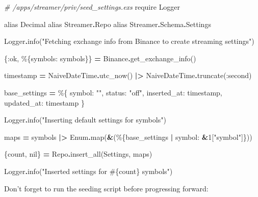 \documentclass[
]{book}
\newenvironment{Shaded}{\begin{snugshade}}{\end{snugshade}}
\newcommand{\CommentTok}[1]{\textcolor[rgb]{0.56,0.35,0.01}{\textit{#1}}}
\newcommand{\ConstantTok}[1]{\textcolor[rgb]{0.00,0.00,0.00}{#1}}
\newcommand{\DecValTok}[1]{\textcolor[rgb]{0.00,0.00,0.81}{#1}}
\newcommand{\ImportTok}[1]{#1}
\newcommand{\NormalTok}[1]{#1}
\newcommand{\OperatorTok}[1]{\textcolor[rgb]{0.81,0.36,0.00}{\textbf{#1}}}
\newcommand{\OtherTok}[1]{\textcolor[rgb]{0.56,0.35,0.01}{#1}}
\newcommand{\StringTok}[1]{\textcolor[rgb]{0.31,0.60,0.02}{#1}}
\newcommand{\VariableTok}[1]{\textcolor[rgb]{0.00,0.00,0.00}{#1}}
\begin{document}
\begin{Shaded}
\begin{Highlighting}[]
\CommentTok{\# /apps/streamer/priv/seed\_settings.exs}
\ImportTok{require} \ConstantTok{Logger}

\ImportTok{alias} \ConstantTok{Decimal}
\ImportTok{alias} \ConstantTok{Streamer}\OperatorTok{.}\ConstantTok{Repo}
\ImportTok{alias} \ConstantTok{Streamer}\OperatorTok{.}\ConstantTok{Schema}\OperatorTok{.}\ConstantTok{Settings}

\ConstantTok{Logger}\OperatorTok{.}\NormalTok{info(}\StringTok{"Fetching exchange info from Binance to create streaming settings"}\NormalTok{)}

\NormalTok{\{}\VariableTok{:ok}\NormalTok{, \%\{}\VariableTok{symbols:}\NormalTok{ symbols\}\} }\OperatorTok{=} \ConstantTok{Binance}\OperatorTok{.}\NormalTok{get\_exchange\_info()}

\NormalTok{timestamp }\OperatorTok{=} \ConstantTok{NaiveDateTime}\OperatorTok{.}\NormalTok{utc\_now()}
  \OperatorTok{|\textgreater{}} \ConstantTok{NaiveDateTime}\OperatorTok{.}\NormalTok{truncate(}\VariableTok{:second}\NormalTok{)}

\NormalTok{base\_settings }\OperatorTok{=}\NormalTok{ \%\{}
  \VariableTok{symbol:} \StringTok{""}\NormalTok{,}
  \VariableTok{status:} \StringTok{"off"}\NormalTok{,}
  \VariableTok{inserted\_at:}\NormalTok{ timestamp,}
  \VariableTok{updated\_at:}\NormalTok{ timestamp}
\NormalTok{\}}

\ConstantTok{Logger}\OperatorTok{.}\NormalTok{info(}\StringTok{"Inserting default settings for symbols"}\NormalTok{)}

\NormalTok{maps }\OperatorTok{=}\NormalTok{ symbols}
  \OperatorTok{|\textgreater{}} \ConstantTok{Enum}\OperatorTok{.}\NormalTok{map(}\OperatorTok{\&}\NormalTok{(\%\{base\_settings }\OperatorTok{|} \VariableTok{symbol:} \OperatorTok{\&}\DecValTok{1}\NormalTok{[}\StringTok{"symbol"}\NormalTok{]\}))}

\NormalTok{\{count, }\ConstantTok{nil}\NormalTok{\} }\OperatorTok{=} \ConstantTok{Repo}\OperatorTok{.}\NormalTok{insert\_all(}\ConstantTok{Settings}\NormalTok{, maps)}

\ConstantTok{Logger}\OperatorTok{.}\NormalTok{info(}\StringTok{"Inserted settings for }\OtherTok{\#\{}\NormalTok{count}\OtherTok{\}}\StringTok{ symbols"}\NormalTok{)}
\end{Highlighting}
\end{Shaded}

Don't forget to run the seeding script before progressing forward:
\end{document}
